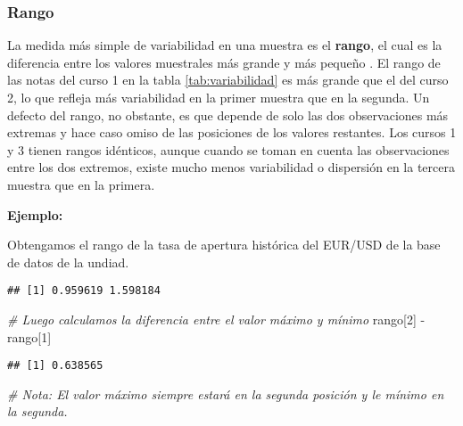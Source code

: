 \documentclass[
]{book}
\newenvironment{Shaded}{\begin{snugshade}}{\end{snugshade}}
\newcommand{\AttributeTok}[1]{\textcolor[rgb]{0.77,0.63,0.00}{#1}}
\newcommand{\CommentTok}[1]{\textcolor[rgb]{0.56,0.35,0.01}{\textit{#1}}}
\newcommand{\DecValTok}[1]{\textcolor[rgb]{0.00,0.00,0.81}{#1}}
\newcommand{\FunctionTok}[1]{\textcolor[rgb]{0.00,0.00,0.00}{#1}}
\newcommand{\NormalTok}[1]{#1}
\newcommand{\SpecialCharTok}[1]{\textcolor[rgb]{0.00,0.00,0.00}{#1}}
\begin{document}
\hypertarget{rango}{%
\subsubsection*{Rango}\label{rango}}

La medida más simple de variabilidad en una muestra es el \textbf{rango}, el cual es la diferencia entre los valores muestrales más grande y más pequeño \citep[página 32]{Devore}. El rango de las notas del curso 1 en la tabla \ref{tab:variabilidad} es más grande que el del curso 2, lo que refleja más variabilidad en la primer muestra que en la segunda. Un defecto del rango, no obstante, es que depende de solo las dos observaciones más extremas y hace caso omiso de las posiciones de los valores restantes. Los cursos 1 y 3 tienen rangos idénticos, aunque cuando se toman en cuenta las observaciones entre los dos extremos, existe mucho menos variabilidad o dispersión en la tercera muestra que en la primera.

\textbf{Ejemplo:}

Obtengamos el rango de la tasa de apertura histórica del EUR/USD de la base de datos de la undiad.

\begin{Shaded}
\end{Shaded}

\begin{verbatim}
## [1] 0.959619 1.598184
\end{verbatim}

\begin{Shaded}
\begin{Highlighting}[]
\CommentTok{\# Luego calculamos la diferencia entre el valor máximo y mínimo}
\NormalTok{rango[}\DecValTok{2}\NormalTok{] }\SpecialCharTok{{-}}\NormalTok{ rango[}\DecValTok{1}\NormalTok{]}
\end{Highlighting}
\end{Shaded}

\begin{verbatim}
## [1] 0.638565
\end{verbatim}

\begin{Shaded}
\begin{Highlighting}[]
\CommentTok{\# Nota: El valor máximo siempre estará en la segunda posición y le mínimo en la segunda.}
\end{Highlighting}
\end{Shaded}
\end{document}
